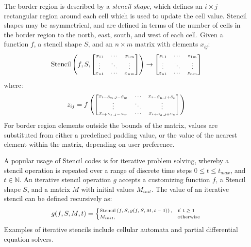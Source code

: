\documentclass[nonatbib,preprint,nocopyrightspace,9pt]{sigplanconf}
\begin{document}
The border region is described by a \emph{stencil shape}, which
defines an $i \times j$ rectangular region around each cell which is
used to update the cell value. Stencil shapes may be asymmetrical, and
are defined in terms of the number of cells in the border region to
the north, east, south, and west of each cell. Given a function $f$, a
stencil shape $S$, and an $n \times m$ matrix with elements $x_{ij}$:
%
\begin{equation}
\scriptsize
\stencil \left( f, S,
\begin{bmatrix}
  x_{11} & \cdots & x_{1m} \\
  \vdots & \ddots & \vdots \\
  x_{n1} & \cdots & x_{nm}
\end{bmatrix} \right)
\to
\begin{bmatrix}
  z_{11} & \cdots & z_{1m} \\
  \vdots & \ddots & \vdots \\
  z_{n1} & \cdots & z_{nm}
\end{bmatrix}
\end{equation}
%
where:
%
\begin{equation}
\scriptsize
z_{ij} = f \left(
\begin{bmatrix}
  x_{i-S_n,j-S_w} & \cdots & x_{i-S_n,j+S_e} \\
  \vdots & \ddots & \vdots \\
  x_{i+S_s,j-S_w} & \cdots & x_{i+S_s,j+S_e}
\end{bmatrix} \right)
\end{equation}
%
For border region elements outside the bounds of the matrix, values
are substituted from either a predefined padding value, or the value
of the nearest element within the matrix, depending on user
preference.

A popular usage of Stencil codes is for iterative problem solving,
whereby a stencil operation is repeated over a range of discrete time
steps $0 \le t \le t_{max}$, and $t \in \mathbb{N}$. An iterative
stencil operation $g$ accepts a customizing function $f$, a Stencil
shape $S$, and a matrix $M$ with initial values $M_{init}$. The value
of an iterative stencil can be defined recursively as:
%
\begin{equation}
\scriptsize
g(f, S, M, t) =
\begin{cases}
  \stencil \left( f, S, g(f, S, M, t-1) \right),& \text{if } t \geq 1\\
  M_{init}, & \text{otherwise}
\end{cases}
\end{equation}
%
Examples of iterative stencils include cellular automata and partial
differential equation solvers. %
\end{document}
